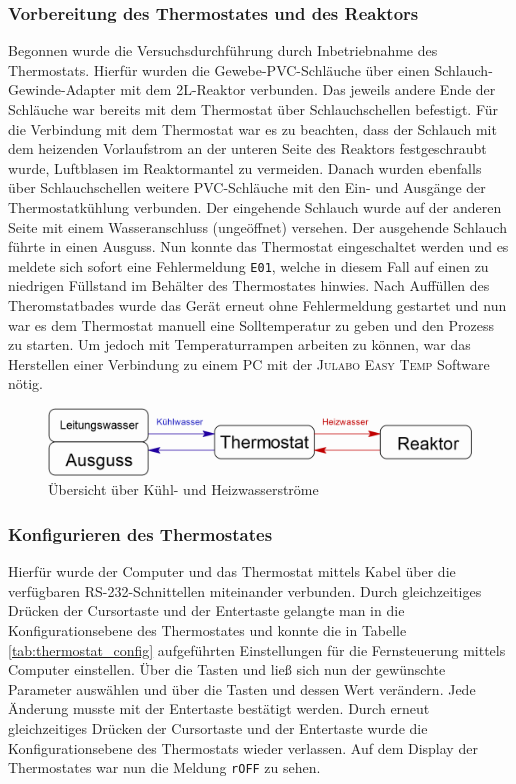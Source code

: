 \documentclass[a4paper, 11pt, draft=false]{scrartcl}
\begin{document}
	\subsubsection*{Vorbereitung des Thermostates und des Reaktors}
	Begonnen wurde die Versuchsdurchführung durch Inbetriebnahme des Thermostats. Hierfür wurden die Gewebe-PVC-Schläuche über einen Schlauch-Gewinde-Adapter mit dem 2L-Reaktor verbunden. Das jeweils andere Ende der Schläuche war bereits mit dem Thermostat über Schlauchschellen befestigt. Für die Verbindung mit dem Thermostat war es zu beachten, dass der Schlauch mit dem heizenden Vorlaufstrom an der unteren Seite des Reaktors festgeschraubt wurde, Luftblasen im Reaktormantel zu vermeiden. Danach wurden ebenfalls über Schlauchschellen weitere PVC-Schläuche mit den Ein- und Ausgänge der Thermostatkühlung verbunden. Der eingehende Schlauch wurde auf der anderen Seite mit einem Wasseranschluss (ungeöffnet) versehen. Der ausgehende Schlauch führte in einen Ausguss. Nun konnte das Thermostat eingeschaltet werden und es meldete sich sofort eine Fehlermeldung \texttt{E01}, welche in diesem Fall auf einen zu niedrigen Füllstand im Behälter des Thermostates hinwies. Nach Auffüllen des Theromstatbades wurde das Gerät erneut ohne Fehlermeldung gestartet und nun war es dem Thermostat manuell eine Solltemperatur zu geben und den Prozess zu starten. Um jedoch mit Temperaturrampen arbeiten zu können, war das Herstellen einer Verbindung zu einem PC mit der \textsc{Julabo Easy Temp} Software nötig.
	
	\begin{figure}[h!]
		\centering
		\includegraphics[width=1.0\textwidth]{img/thermostat_ubersicht}
		\caption{Übersicht über Kühl- und Heizwasserströme}
	\end{figure}
	\FloatBarrier
	
	\subsubsection*{Konfigurieren des Thermostates}
	Hierfür wurde der Computer und das Thermostat mittels Kabel über die verfügbaren RS-232-Schnittellen miteinander verbunden. Durch gleichzeitiges Drücken der Cursortaste \keys{\arrowkeyleft} und der Entertaste \keys{\return} gelangte man in die Konfigurationsebene des Thermostates und konnte die in Tabelle \ref{tab:thermostat_config} aufgeführten Einstellungen für die Fernsteuerung mittels Computer einstellen. Über die Tasten \keys{\arrowkeyleft} und \keys{\arrowkeyright} ließ sich nun der gewünschte Parameter auswählen und über die Tasten \keys{\arrowkeyup} und  \keys{\arrowkeydown} dessen Wert verändern. Jede Änderung musste mit der Entertaste \keys{\return} bestätigt werden. Durch erneut gleichzeitiges Drücken der Cursortaste \keys{\arrowkeyleft} und der Entertaste \keys{\return} wurde die Konfigurationsebene des Thermostats wieder verlassen. Auf dem Display der Thermostates war nun die Meldung \texttt{rOFF} zu sehen.
\end{document}
